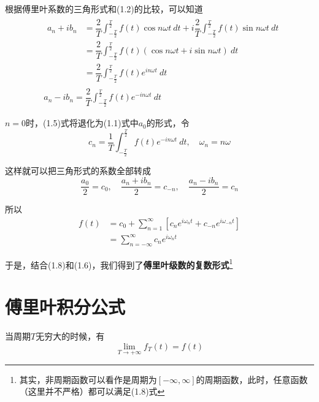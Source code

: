 \documentclass[UTF8]{ctexbook}
\begin{document}
			根据傅里叶系数的三角形式和(1.2)的比较，可以知道
			\begin{equation}
				\begin{split}
					&\begin{split}
						a_n+ib_n&=\dfrac{2}{T}\int_{-\frac{T}{2}}^{\frac{T}{2}}f(t)\cos n\omega t\ dt+i\dfrac{2}{T}\int_{-\frac{T}{2}}^{\frac{T}{2}}f(t)\sin n\omega t\ dt\\
						&= \dfrac{2}{T}\int_{-\frac{T}{2}}^{\frac{T}{2}}f(t)(\cos n\omega t+i\sin n\omega t)\ dt\\
						&= \dfrac{2}{T}\int_{-\frac{T}{2}}^{\frac{T}{2}}f(t)e^{in\omega t}\ dt
					\end{split}\\
					&a_n-ib_n=\dfrac{2}{T}\int_{-\frac{T}{2}}^{\frac{T}{2}}f(t)e^{-in\omega t}\ dt
				\end{split}
			\end{equation}

			$n=0$时，(1.5)式将退化为(1.1)式中$a_0$的形式，令
			\begin{equation}
				c_n=\dfrac{1}{T}\int_{-\frac{T}{2}}^{\frac{T}{2}}f(t)e^{-in\omega t}\ dt, \quad \omega_n=n\omega
			\end{equation}

			这样就可以把三角形式的系数全部转成
			\begin{equation}
				\dfrac{a_0}{2}=c_0,\quad
				\dfrac{a_n+ib_n}{2}=c_{-n},\quad
				\dfrac{a_n-ib_n}{2}=c_{n}
			\end{equation}

			所以
			\begin{equation}
				\begin{split}
					f(t)&= c_0+\sum\limits_{n=1}^\infty[c_n e^{i\omega_n t}+c_{-n}e^{i\omega_{-n} t}]\\
					&= \sum\limits_{n=-\infty}^{\infty}c_n e^{i\omega_n t}
				\end{split}
			\end{equation}

			于是，结合(1.8)和(1.6)，我们得到了\textbf{傅里叶级数的复数形式}\footnote{其实，非周期函数可以看作是周期为$[-\infty, \infty]$的周期函数，此时，任意函数（这里并不严格）都可以满足(1.8)式}

		\section{傅里叶积分公式}
			当周期$T$无穷大的时候，有
			\begin{equation}
				\lim_{T\to +\infty}f_T(t)=f(t)
			\end{equation}
\end{document}

